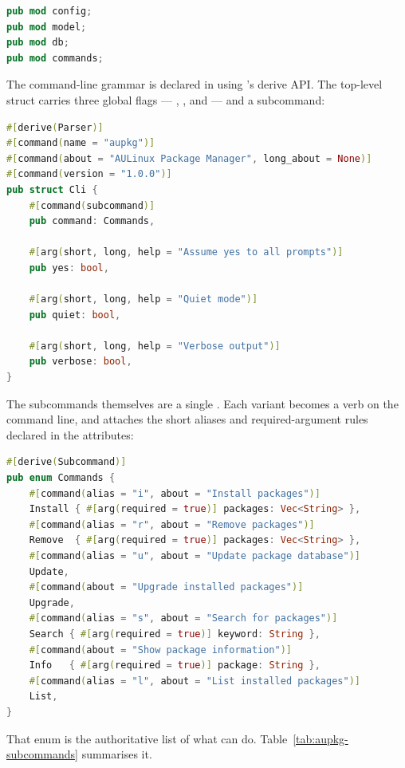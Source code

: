 \begin{lstlisting}[language=Rust, caption={\file{lib.rs} --- the crate's module layout}]
pub mod config;
pub mod model;
pub mod db;
pub mod commands;
\end{lstlisting}

The command-line grammar is declared in  using 's derive API. The top-level  struct carries three global flags --- , , and  --- and a subcommand:

\begin{lstlisting}[language=Rust, caption={\file{commands.rs} --- the top-level \code{Cli} parser}]
#[derive(Parser)]
#[command(name = "aupkg")]
#[command(about = "AULinux Package Manager", long_about = None)]
#[command(version = "1.0.0")]
pub struct Cli {
    #[command(subcommand)]
    pub command: Commands,

    #[arg(short, long, help = "Assume yes to all prompts")]
    pub yes: bool,

    #[arg(short, long, help = "Quiet mode")]
    pub quiet: bool,

    #[arg(short, long, help = "Verbose output")]
    pub verbose: bool,
}
\end{lstlisting}

The subcommands themselves are a single . Each variant becomes a verb on the command line, and  attaches the short aliases and required-argument rules declared in the attributes:

\begin{lstlisting}[language=Rust, caption={\file{commands.rs} --- the \code{Commands} subcommand enum}]
#[derive(Subcommand)]
pub enum Commands {
    #[command(alias = "i", about = "Install packages")]
    Install { #[arg(required = true)] packages: Vec<String> },
    #[command(alias = "r", about = "Remove packages")]
    Remove  { #[arg(required = true)] packages: Vec<String> },
    #[command(alias = "u", about = "Update package database")]
    Update,
    #[command(about = "Upgrade installed packages")]
    Upgrade,
    #[command(alias = "s", about = "Search for packages")]
    Search { #[arg(required = true)] keyword: String },
    #[command(about = "Show package information")]
    Info   { #[arg(required = true)] package: String },
    #[command(alias = "l", about = "List installed packages")]
    List,
}
\end{lstlisting}

That enum is the authoritative list of what  can do. Table~\ref{tab:aupkg-subcommands} summarises it.

